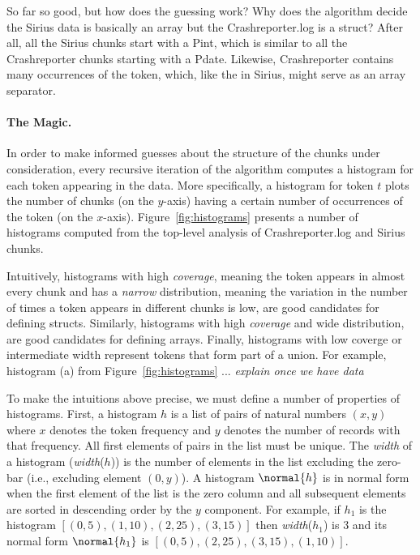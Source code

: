 So far so good, but how does the guessing work?  Why does the
algorithm decide the Sirius data is basically an array but the
Crashreporter.log is a struct? After all, all the Sirius chunks start
with a Pint, which is similar to all the Crashreporter chunks starting
with a Pdate.  Likewise, Crashreporter contains many occurrences of
the  token, which, like the  in Sirius, might serve as
an array separator.

\paragraph*{The Magic.}
In order to make informed guesses about the structure of the chunks
under consideration, every recursive iteration of the algorithm computes 
a histogram for each token appearing in the data.
More specifically, a histogram for token $t$
plots the number of chunks (on the $y$-axis)
having a certain number of occurrences of the token (on the $x$-axis). 
Figure~\ref{fig:histograms} presents a number of histograms computed
from the top-level analysis of Crashreporter.log and Sirius chunks.

Intuitively, histograms with high {\em coverage}, meaning the token appears
in almost every chunk and has a {\em narrow} distribution, meaning the variation in
the number of times a token appears in different chunks is low, are
good candidates for defining structs.  Similarly, histograms with
high {\em coverage} and wide distribution, are good candidates for defining
arrays.  Finally, histograms with low coverge or intermediate width
represent tokens that form part of a union.  For example, histogram (a)
from Figure~\ref{fig:histograms} ... {\em explain once we have data}

To make the intuitions above precise, we must define a number of
properties of histograms.  First, a histogram $h$ is a list of pairs
of natural numbers $(x,y)$ where $x$ denotes the token frequency and
$y$ denotes the number of records with that frequency.  
All first elements of pairs in the list must be unique.  
The {\em width} of a
histogram ({\em width}($h$)) is the number of elements in the list
excluding the zero-bar ({i.e.,} excluding element $(0,y)$).  
A histogram
$\normal{h}$ is in normal form when the first element of the list is
the zero column and all subsequent elements are sorted in descending
order by the $y$ component.  For example, if $h_1$ is the histogram
$[(0,5), (1,10), (2,25), (3,15)]$ then {\em width}($h_1$) is 3 and its
normal form $\normal{h_1}$ is $[(0,5), (2, 25), (3,15), (1,10)]$.

